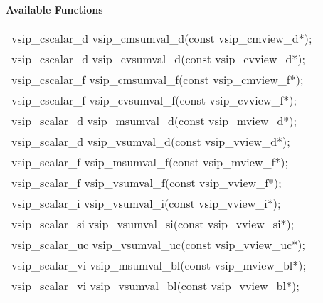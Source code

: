 \\\cvsiplh
\newline \hspace*{.8cm} \vspace*{.1cm} \textbf{Available Functions }
\newline \hspace*{1.1cm} {
\ttfamily
\begin{tabular}[H]{l}
vsip\_cscalar\_d vsip\_cmsumval\_d(const vsip\_cmview\_d*);\\
vsip\_cscalar\_d vsip\_cvsumval\_d(const vsip\_cvview\_d*);\\
vsip\_cscalar\_f vsip\_cmsumval\_f(const vsip\_cmview\_f*);\\
vsip\_cscalar\_f vsip\_cvsumval\_f(const vsip\_cvview\_f*);\\
vsip\_scalar\_d vsip\_msumval\_d(const vsip\_mview\_d*);\\
vsip\_scalar\_d vsip\_vsumval\_d(const vsip\_vview\_d*);\\
vsip\_scalar\_f vsip\_msumval\_f(const vsip\_mview\_f*);\\
vsip\_scalar\_f vsip\_vsumval\_f(const vsip\_vview\_f*);\\
vsip\_scalar\_i vsip\_vsumval\_i(const vsip\_vview\_i*);\\
vsip\_scalar\_si vsip\_vsumval\_si(const vsip\_vview\_si*);\\
vsip\_scalar\_uc vsip\_vsumval\_uc(const vsip\_vview\_uc*);\\
vsip\_scalar\_vi vsip\_msumval\_bl(const vsip\_mview\_bl*);\\
vsip\_scalar\_vi vsip\_vsumval\_bl(const vsip\_vview\_bl*);\\
\end{tabular}
}
\\\pyjvsiph